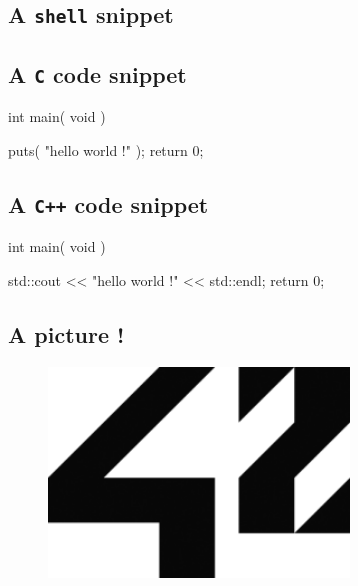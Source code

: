 \documentclass{42-en}
\begin{document}
        \subsection{A \texttt{shell} snippet}




        \subsection{A \texttt{C} code snippet}

           \begin{42ccode}
int main( void ) {

    puts( "hello world !" );
    return 0;
}
\end{42ccode}


        \subsection{A \texttt{C++} code snippet}

            \begin{42cppcode}
int main( void ) {

    std::cout << "hello world !" << std::endl;
    return 0;
}
\end{42cppcode}


        \subsection{A picture !}

            \begin{figure}[H]
                \begin{center}
                    \includegraphics[width=8cm]{42.png}
                \end{center}
            \end{figure}
\end{document}
